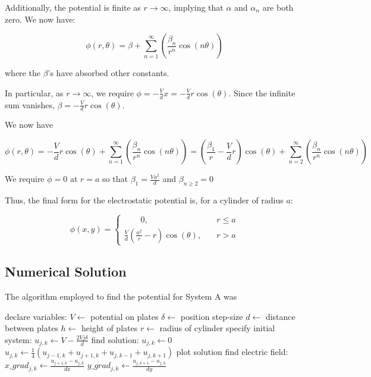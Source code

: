\documentclass{article}
\newcommand{\be}{\begin{equation}}
\newcommand{\ee}{\end{equation}}
\begin{document}
Additionally, the potential is finite as $r \rightarrow \infty$, implying that
$\alpha$ and $\alpha_n$ are both zero. We now have:

\be
\phi(r,\theta)=\beta + \sum_{n=1}^{\infty}(\frac{\beta_n}{r^n} \cos(n\theta))
\ee

where the $\beta$'s have absorbed other constants.

In particular, as $r \rightarrow \infty$, we require
$\phi=-\frac{V}{d}x=-\frac{V}{d}r\cos(\theta)$. Since the infinite sum vanishes,
$\beta=-\frac{V}{d}r\cos(\theta)$.

We now have

\be
\phi(r,\theta)=-\frac{V}{d}r\cos(\theta) + \sum_{n=1}^{\infty}(\frac{\beta_n}{r^n} \cos(n\theta))
              =(\frac{\beta_1}{r}-\frac{V}{d}r)\cos(\theta) + \sum_{n=2}^{\infty}(\frac{\beta_n}{r^n} \cos(n\theta))
\ee

We require $\phi=0$ at $r=a$ so that $\beta_1=\frac{Va^2}{d}$ and $\beta_{n \geq 2}=0$

Thus, the final form for the electrostatic potential is, for a cylinder of radius $a$:

\be
\phi(x,y)=
\begin{cases} \qquad 0, & \quad r \leq a \\
\frac{V}{d}(\frac{a^2}{r}-r)\cos(\theta), & \quad r > a
\end{cases}
\ee

\subsection{Numerical Solution}

The algorithm employed to find the potential for System A was

\begin{algorithm}
\begin{algorithmic}[]
\State declare variables:
\State $V \gets$ potential on plates
\State $\delta \gets$ position step-size
\State $d \gets$ distance between plates
\State $h \gets$ height of plates
\State $r \gets$ radius of cylinder
\State specify initial system:
      \State $u_{j, k} \gets V-\frac{2Vj\delta}{d}$
   \EndFor
\EndFor
\State find solution:
         \State $u_{j, k} \gets 0$
      \Else
         \State $u_{j,k} \gets \frac{1}{4}(u_{j-1,k}+u_{j+1,k}+u_{j,k-1}+u_{j,k+1})$
      \EndIf
   \EndFor
\EndFor
\State plot solution
\State find electric field:
      \State $x\_grad_{j, k} \gets \frac{u_{j+1,k}-u_{j,k}}{dx}$
      \State $y\_grad_{j,k} \gets \frac{u_{j,k+1}-u_{j,k}}{dy}$
   \EndFor
\EndFor
\EndProcedure
\end{algorithmic}
\end{algorithm}
\end{document}
